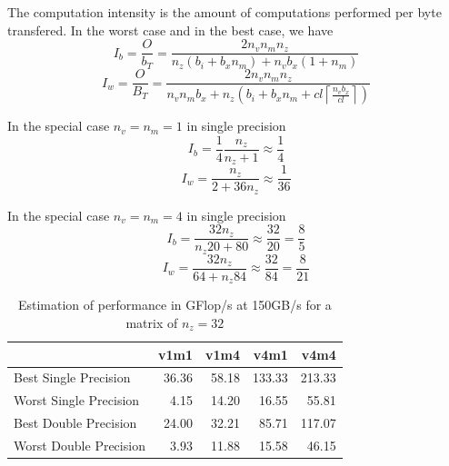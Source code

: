 \documentclass[10pt,conference,compsocconf]{IEEEtran}
\newcommand{\ceil}[1]{\left\lceil#1\right\rceil}
\begin{document}
The computation intensity is the amount of computations performed per
byte transfered. In the worst case and in the best case, we have
$$I_b = \frac{O}{b_T} = \frac{2 n_v n_m n_z}{n_z (b_i + b_x n_m) + n_v b_x (1 + n_m)}$$
$$I_w = \frac{O}{B_T} = \frac{2 n_v n_m n_z}{n_v n_m b_x + n_z \left ( b_i + b_x n_m +  cl \ceil{\frac{n_vb_x}{cl}} \right)}$$

In the special case $n_v=n_m=1$ in single precision
$$I_b = \frac{1}{4} \frac{ n_z }{ n_z + 1} \approx \frac{1}{4}$$
$$I_w = \frac{n_z }{2  + 36  n_z} \approx \frac{1}{36}$$

In the special case $n_v=n_m=4$ in single precision
$$I_b = \frac{32 n_z }{ n_z 20 + 80} \approx \frac{32}{20} = \frac{8}{5} $$
$$I_w = \frac{32 n_z }{64 + n_z 84} \approx \frac{32}{84} = \frac{8}{21} $$

\begin{table}
  \centering
  \begin{tabular}{|l|r|r|r|r|}
    \hline
                           & v1m1  & v1m4  & v4m1   & v4m4  \\
    \hline
    Best Single Precision  & 36.36 & 58.18 & 133.33 & 213.33\\
    Worst Single Precision &  4.15 & 14.20 &  16.55 &  55.81\\
    Best Double Precision  & 24.00 & 32.21 &  85.71 & 117.07\\
    Worst Double Precision &  3.93 & 11.88 &  15.58 &  46.15\\
    \hline
  \end{tabular}

  \caption{Estimation of performance in GFlop/s at 150GB/s for a matrix of $n_z = 32$}
\end{table}
\end{document}
